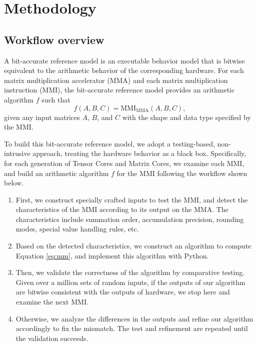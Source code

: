 \section{Methodology}
\label{sec:method}

\subsection{Workflow overview}

A bit-accurate reference model is an executable behavior model that is bitwise equivalent to the arithmetic behavior of the corresponding hardware. For each matrix multiplication accelerator (MMA) and each matrix multiplication instruction (MMI), the bit-accurate reference model provides an arithmetic algorithm $f$ such that
\begin{equation}
    f(A,B,C) = \mathrm{MMI}_{\mathrm{MMA}}(A,B,C),
\end{equation}
given any input matrices $A$, $B$, and $C$ with the shape and data type specified by the MMI.

To build this bit-accurate reference model, we adopt a testing-based, non-intrusive approach, treating the hardware behavior as a black box. Specifically, for each generation of Tensor Cores and Matrix Cores, we examine each MMI, and build an arithmetic algorithm $f$ for the MMI following the workflow shown below.

\begin{enumerate}
    \item First, we construct specially crafted inputs to test the MMI, and detect the characteristics of the MMI according to its output on the MMA. The characteristics include summation order, accumulation precision, rounding modes, special value handling rules, etc.
    \item Based on the detected characteristics, we construct an algorithm to compute Equation \ref{eq:mm}, and implement this algorithm with Python.
    \item Then, we validate the correctness of the algorithm by comparative testing. Given over a million sets of random inputs, if the outputs of our algorithm are bitwise consistent with the outputs of hardware, we stop here and examine the next MMI.
    \item Otherwise, we analyze the differences in the outputs and refine our algorithm accordingly to fix the mismatch. The test and refinement are repeated until the validation succeeds.
\end{enumerate}


